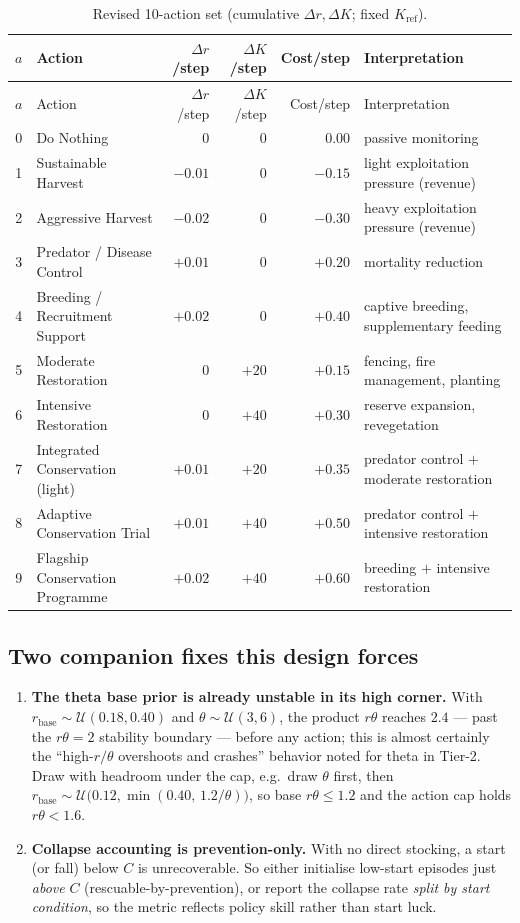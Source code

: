 \documentclass[11pt]{article}
\newcommand{\rbase}{r_{\mathrm{base}}}
\newcommand{\Kref}{K_{\mathrm{ref}}}
\begin{document}
\begin{longtable}{@{}c p{3.2cm} r r r p{4.4cm}@{}}
\caption{Revised 10-action set (cumulative $\Delta r,\Delta K$; fixed $\Kref$).}\\
\toprule
$a$ & Action & $\Delta r$/step & $\Delta K$/step & Cost/step & Interpretation \\
\midrule
\endfirsthead
\toprule
$a$ & Action & $\Delta r$/step & $\Delta K$/step & Cost/step & Interpretation \\
\midrule
\endhead
0 & Do Nothing & $0$ & $0$ & $0.00$ & passive monitoring \\
1 & Sustainable Harvest & $-0.01$ & $0$ & $-0.15$ & light exploitation pressure (revenue) \\
2 & Aggressive Harvest & $-0.02$ & $0$ & $-0.30$ & heavy exploitation pressure (revenue) \\
3 & Predator / Disease Control & $+0.01$ & $0$ & $+0.20$ & mortality reduction \\
4 & Breeding / Recruitment Support & $+0.02$ & $0$ & $+0.40$ & captive breeding, supplementary feeding \\
5 & Moderate Restoration & $0$ & $+20$ & $+0.15$ & fencing, fire management, planting \\
6 & Intensive Restoration & $0$ & $+40$ & $+0.30$ & reserve expansion, revegetation \\
7 & Integrated Conservation (light) & $+0.01$ & $+20$ & $+0.35$ & predator control $+$ moderate restoration \\
8 & Adaptive Conservation Trial & $+0.01$ & $+40$ & $+0.50$ & predator control $+$ intensive restoration \\
9 & Flagship Conservation Programme & $+0.02$ & $+40$ & $+0.60$ & breeding $+$ intensive restoration \\
\bottomrule
\end{longtable}

\subsection{Two companion fixes this design forces}
\begin{enumerate}[leftmargin=1.6em,nosep]
\item \textbf{The theta base prior is already unstable in its high corner.} With
$\rbase\sim\mathcal{U}(0.18,0.40)$ and $\theta\sim\mathcal{U}(3,6)$, the product
$r\theta$ reaches $2.4$ --- past the $r\theta{=}2$ stability boundary --- before
any action; this is almost certainly the ``high-$r/\theta$ overshoots and crashes''
behavior noted for theta in Tier-2. Draw with headroom under the cap, e.g.\ draw
$\theta$ first, then $\rbase\sim\mathcal{U}\big(0.12,\min(0.40,\,1.2/\theta)\big)$,
so base $r\theta\le 1.2$ and the action cap holds $r\theta<1.6$.
\item \textbf{Collapse accounting is prevention-only.} With no direct stocking, a
start (or fall) below $C$ is unrecoverable. So either initialise low-start episodes
just \emph{above} $C$ (rescuable-by-prevention), or report the collapse rate
\emph{split by start condition}, so the metric reflects policy skill rather than
start luck.
\end{enumerate}
\end{document}
